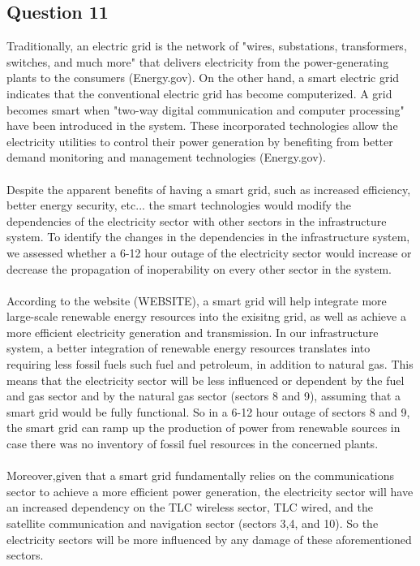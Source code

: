 \documentclass[11pt,a4paper]{article}
\begin{document}
\subsection*{Question 11}
Traditionally, an electric grid is the network  of "wires, substations, transformers, switches, and much more" that delivers electricity from the power-generating plants to the consumers (Energy.gov). On the other hand, a smart electric grid indicates that the conventional electric grid has become computerized. A grid becomes smart when "two-way digital communication and computer processing" have been introduced in the system. These incorporated technologies allow the electricity utilities to control their power generation by benefiting from better demand monitoring and management technologies (Energy.gov).\\
\\
Despite the apparent benefits of having a smart grid, such as increased efficiency, better energy security, etc... the smart technologies would modify the dependencies of the electricity sector with other sectors in the infrastructure system. To identify the changes in the dependencies in the infrastructure system, we assessed whether a 6-12 hour outage of the electricity sector would increase or decrease the propagation of inoperability on every other sector in the system. \\
\\
According to the website (WEBSITE), a smart grid will help integrate more large-scale renewable energy resources into the exisitng grid, as well as achieve a more efficient electricity generation and transmission. In our infrastructure system, a better integration of renewable energy resources translates into requiring less fossil fuels such fuel and petroleum, in addition to natural gas. This means that the electricity sector will be less influenced or dependent by the fuel and gas sector and by the natural gas sector (sectors 8 and 9), assuming that a smart grid would be fully functional. So in a 6-12 hour outage of sectors 8 and 9, the smart grid can ramp up the production of power from renewable sources in case there was no inventory of fossil fuel resources in the concerned plants.\\
\\ 
Moreover,given that a smart grid fundamentally relies on the communications sector to achieve a more efficient power generation, the electricity sector will have an increased dependency on the TLC wireless sector, TLC wired, and the satellite communication and navigation sector (sectors 3,4, and 10). So the electricity sectors will be more influenced by any damage of these aforementioned sectors.\\
\end{document}
